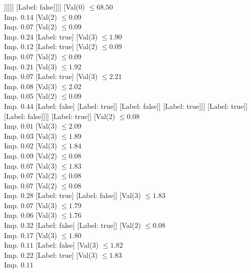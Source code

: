 \documentclass[margin=10pt]{standalone}
\begin{document}
\begin{forest}
											]]]]]
						[Label: false]]]]
			[Val($0$) $ \leq 68.50$ \\ Imp. $0.14$
				[Val($2$) $ \leq 0.09$ \\ Imp. $0.07$
					[Val($2$) $ \leq 0.09$ \\ Imp. $0.24$
						[Label: true]
						[Val($3$) $ \leq 1.90$ \\ Imp. $0.12$
							[Label: true]
							[Val($2$) $ \leq 0.09$ \\ Imp. $0.07$
								[Val($2$) $ \leq 0.09$ \\ Imp. $0.21$
									[Val($3$) $ \leq 1.92$ \\ Imp. $0.07$
										[Label: true]
										[Val($3$) $ \leq 2.21$ \\ Imp. $0.08$
											[Val($3$) $ \leq 2.02$ \\ Imp. $0.05$
												[Val($2$) $ \leq 0.09$ \\ Imp. $0.44$
													[Label: false]
													[Label: true]]
												[Label: false]]
											[Label: true]]]
									[Label: true]]
								[Label: false]]]]
					[Label: true]]
				[Val($2$) $ \leq 0.08$ \\ Imp. $0.01$
					[Val($3$) $ \leq 2.09$ \\ Imp. $0.03$
						[Val($3$) $ \leq 1.89$ \\ Imp. $0.02$
							[Val($3$) $ \leq 1.84$ \\ Imp. $0.09$
								[Val($2$) $ \leq 0.08$ \\ Imp. $0.07$
									[Val($3$) $ \leq 1.83$ \\ Imp. $0.07$
										[Val($2$) $ \leq 0.08$ \\ Imp. $0.07$
											[Val($2$) $ \leq 0.08$ \\ Imp. $0.28$
												[Label: true]
												[Label: false]]
											[Val($3$) $ \leq 1.83$ \\ Imp. $0.07$
												[Val($3$) $ \leq 1.79$ \\ Imp. $0.06$
													[Val($3$) $ \leq 1.76$ \\ Imp. $0.32$
														[Label: false]
														[Label: true]]
													[Val($2$) $ \leq 0.08$ \\ Imp. $0.17$
														[Val($3$) $ \leq 1.80$ \\ Imp. $0.11$
															[Label: false]
															[Val($3$) $ \leq 1.82$ \\ Imp. $0.22$
																[Label: true]
																[Val($3$) $ \leq 1.83$ \\ Imp. $0.11$

\end{forest}
\end{document}
